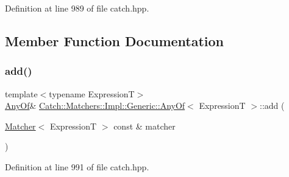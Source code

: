 Definition at line 989 of file catch.\+hpp.



\subsection{Member Function Documentation}
\hypertarget{class_catch_1_1_matchers_1_1_impl_1_1_generic_1_1_any_of_a3bce94b627551e5f96c5f9c6060413f0}{}\label{class_catch_1_1_matchers_1_1_impl_1_1_generic_1_1_any_of_a3bce94b627551e5f96c5f9c6060413f0} 
\subsubsection{\texorpdfstring{add()}{add()}}
{\footnotesize\ttfamily template$<$typename ExpressionT$>$ \\
\hyperlink{class_catch_1_1_matchers_1_1_impl_1_1_generic_1_1_any_of}{Any\+Of}\& \hyperlink{class_catch_1_1_matchers_1_1_impl_1_1_generic_1_1_any_of}{Catch\+::\+Matchers\+::\+Impl\+::\+Generic\+::\+Any\+Of}$<$ ExpressionT $>$\+::add (\begin{DoxyParamCaption}\item[{\hyperlink{struct_catch_1_1_matchers_1_1_impl_1_1_matcher}{Matcher}$<$ ExpressionT $>$ const \&}]{matcher }\end{DoxyParamCaption})\hspace{0.3cm}{\ttfamily [inline]}}



Definition at line 991 of file catch.\+hpp.

